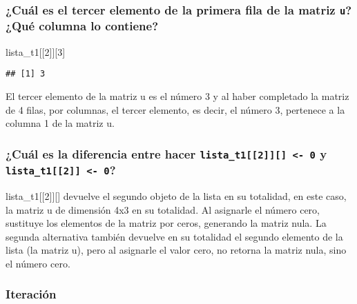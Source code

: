 \documentclass[
]{article}
\newenvironment{Shaded}{\begin{snugshade}}{\end{snugshade}}
\newcommand{\DecValTok}[1]{\textcolor[rgb]{0.00,0.00,0.81}{#1}}
\newcommand{\NormalTok}[1]{#1}
\begin{document}
\hypertarget{cuuxe1l-es-el-tercer-elemento-de-la-primera-fila-de-la-matriz-u-quuxe9-columna-lo-contiene}{%
\subsubsection{\texorpdfstring{¿Cuál es el tercer elemento de la primera
fila de la matriz \texttt{u}? ¿Qué columna lo
contiene?}{¿Cuál es el tercer elemento de la primera fila de la matriz u? ¿Qué columna lo contiene?}}\label{cuuxe1l-es-el-tercer-elemento-de-la-primera-fila-de-la-matriz-u-quuxe9-columna-lo-contiene}}

\begin{Shaded}
\begin{Highlighting}[]
\NormalTok{lista\_t1[[}\DecValTok{2}\NormalTok{]][}\DecValTok{3}\NormalTok{]}
\end{Highlighting}
\end{Shaded}

\begin{verbatim}
## [1] 3
\end{verbatim}

El tercer elemento de la matriz u es el número 3 y al haber completado
la matriz de 4 filas, por columnas, el tercer elemento, es decir, el
número 3, pertenece a la columna 1 de la matriz u.

\hypertarget{cuuxe1l-es-la-diferencia-entre-hacer-lista_t12---0-y-lista_t12---0}{%
\subsubsection{\texorpdfstring{¿Cuál es la diferencia entre hacer
\texttt{lista\_t1{[}{[}2{]}{]}{[}{]}\ \textless{}-\ 0} y
\texttt{lista\_t1{[}{[}2{]}{]}\ \textless{}-\ 0}?}{¿Cuál es la diferencia entre hacer lista\_t1{[}{[}2{]}{]}{[}{]} \textless- 0 y lista\_t1{[}{[}2{]}{]} \textless- 0?}}\label{cuuxe1l-es-la-diferencia-entre-hacer-lista_t12---0-y-lista_t12---0}}

lista\_t1{[}{[}2{]}{]}{[}{]} devuelve el segundo objeto de la lista en
su totalidad, en este caso, la matriz u de dimensión 4x3 en su
totalidad. Al asignarle el número cero, sustituye los elementos de la
matriz por ceros, generando la matriz nula. La segunda alternativa
también devuelve en su totalidad el segundo elemento de la lista (la
matriz u), pero al asignarle el valor cero, no retorna la matriz nula,
sino el número cero.

\hypertarget{iteraciuxf3n}{%
\subsubsection{Iteración}\label{iteraciuxf3n}}
\end{document}
